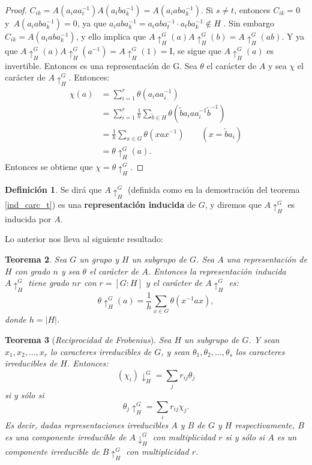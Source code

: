 \documentclass[12pt]{book}
\newtheorem{theorem}{Teorema}[section]
\theoremstyle{definition}
\newtheorem{definition}[theorem]{Definición}
\newcounter{in}
\newcounter{ini}
\begin{document}
\begin{proof}
$C_{ik}=A(a_{i} a a_{t}^{-1}) A(a_{t} b a_{k}^{-1})=A(a_{i} ab
a_{k}^{-1})$. Si $s \neq t$, entonces $C_{ik}=0$
y~$A(a_{i} ab a_{k}^{-1}) = 0$, ya que
$a_{i} ab a_{k}^{-1} = a_{i} ab a_{t}^{-1} \cdot a_{t} b a_{k}^{-1}
\notin H$ . Sin embargo
$C_{ik} = A(a_{i} ab a_{k}^{-1})$, y ello implica que
$A\uparrow^{G}_{H}(a)A\uparrow^{G}_{H}(b)=A\uparrow^{G}_{H}(ab)$. Y ya que
$A\uparrow^{G}_{H}(a)A\uparrow^{G}_{H}(a^{-1})=A\uparrow^{G}_{H}(1)=\mathrm{I}$, se sigue que $A\uparrow^{G}_{H}(a)$
es invertible. Entonces es una representación de G.
Sea $\theta$ el carácter de $A$ y sea $\chi$ el carácter de
$A\uparrow^{G}_{H}$. Entonces:
\begin{equation}
  \label{eq:64}
  \begin{aligned}
    \chi(a) &= \sum_{i=1}^{r} \theta(a_{i} a a_{i}^{-1}) \\
    & = \sum_{i=1}^{r} \frac{1}{h} \sum_{\tilde{b} \in H} \theta(\tilde{b} a_{i} a a_{i}^{-1} \tilde{b}^{-1})\\
    &= \frac{1}{h} \sum_{x \in G} \theta(x a x^{-1}) \qquad (x=\tilde{b}a_{i})\\
    &= \theta\uparrow^{G}_{H}(a).
  \end{aligned}
\end{equation}
Entonces se obtiene que $\chi=\theta\uparrow^{G}_{H}$. 
\end{proof}
\begin{definition}
Se dirá que $A\uparrow^{G}_{H}$ (definida como en la demostración del teorema \ref{ind_carc_t}) es una
\textbf{representación inducida} de $G$, y diremos que $A\uparrow^{G}_{H}$ es inducida por
$A$. 
\end{definition}
Lo anterior nos lleva al siguiente resultado:
\begin{theorem}
  \label{t5_2}
  Sea $G$ un grupo y $H$ un subgrupo de $G$. Sea $A$ una
  representación de $H$ con grado $n$ y sea $\theta$ el carácter de
  $A$. Entonces la representación inducida $A\uparrow^{G}_{H}$ tiene grado $nr$
  con $r=[G:H]$ y el carácter de $A\uparrow^{G}_{H}$ es:
  \begin{equation*}
    \theta\uparrow^{G}_{H}(a)= \frac{1}{h}\sum_{x \in G} \theta(x^{-1} a x),
  \end{equation*}
  donde $h= |H|$.
\end{theorem}
\begin{theorem}[\textit{Reciprocidad de Frobenius}]
  \label{t5_3}
  Sea $H$ un subgrupo
  de $G$. Y sean $x_{1}, x_{2},\ldots,x_{r}$ lo caracteres irreducibles
  de $G$, y sean $\theta_{1},\theta_{2},\ldots,\theta_{s}$ los
  caracteres irreducibles de $H$. Entonces:
  \begin{equation*}
    (\chi_{i})\downarrow^{G}_{H} = \sum_{j} r_{ij} \theta_{j} 
  \end{equation*}
  si y sólo si 
  \begin{equation*}
    \theta_{j}\uparrow^{G}_{H} = \sum_{i} r_{ij} \chi_{j}.
  \end{equation*}
  Es decir, dadas representaciones irreducibles $A$ y $B$ de $G$ y $H$
  respectivamente, $B$ es una componente irreducible de $A\downarrow^{G}_{H}$ con
  multiplicidad $r$ si y sólo si $A$ es un componente irreducible de
  $B\uparrow^{G}_{H}$ con multiplicidad $r$.
\end{theorem}
\end{document}
